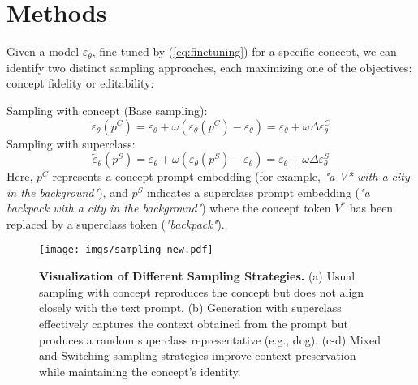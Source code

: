 \section{Methods}
\label{sec:method}
Given a model $\varepsilon_{\theta}$, fine-tuned by (\ref{eq:finetuning}) for a specific concept, we can identify two distinct sampling approaches, each maximizing one of the objectives: concept fidelity or editability:

Sampling with concept (Base sampling):
\begin{equation} 
  \label{eq:concept_sampling}
  \tilde{\varepsilon}_{\theta}(p^C) = \varepsilon_{\theta} + \omega(\varepsilon_{\theta}(p^C) - \varepsilon_{\theta}) = \varepsilon_{\theta} + \omega \Delta\varepsilon_{\theta}^{C}
\end{equation}
Sampling with superclass:
\begin{equation}
  \label{eq:superclass_sampling}
  \tilde{\varepsilon}_{\theta}(p^S) = \varepsilon_{\theta} + \omega( \varepsilon_{\theta}(p^S) - \varepsilon_{\theta}) = \varepsilon_{\theta} + \omega \Delta\varepsilon_{\theta}^{S}
\end{equation} 
Here, $p^C$ represents a concept prompt embedding (for example, \textit{"a V* with a city in the background"}), and $p^S$ indicates a superclass prompt embedding (\textit{"a backpack with a city in the background"}) where the concept token $V^*$ has been replaced by a superclass token (\textit{"backpack"}).

\begin{figure*}[ht!]
  \centering
  \vspace{-0.02in}
  \texttt{[image: imgs/sampling\_new.pdf]}
  \vspace{-0.20in}
  \caption{\textbf{Visualization of Different Sampling Strategies.} (a) Usual sampling with concept reproduces the concept but does not align closely with the text prompt. (b) Generation with superclass effectively captures the context obtained from the prompt but produces a random superclass representative (e.g., dog). (c-d) Mixed and Switching sampling strategies improve context preservation while maintaining the concept's identity.}
  \label{fig:sampling}
  \vspace{-0.20in}
\end{figure*}

